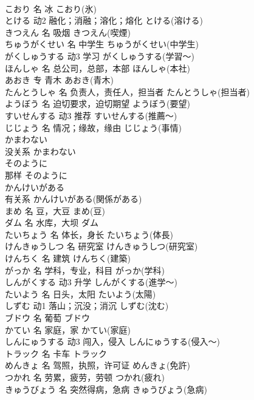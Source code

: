 \documentclass[8pt]{extreport}
\begin{document}
\begin{CJK}{UTF8}{min}
\\	こおり	名	冰	こおり(氷)	
\\	とける	动2	融化；消融；溶化；熔化	とける(溶ける)	
\\	きつえん	名	吸烟	きつえん(喫煙)	
\\	ちゅうがくせい	名	中学生	ちゅうがくせい(中学生)	
\\	がくしゅうする	动3	学习	がくしゅうする(学習～)	
\\	ほんしゃ	名	总公司，总部，本部	ほんしゃ(本社)	
\\	あおき	专	青木	あおき(青木)	
\\	たんとうしゃ	名	负责人，责任人，担当者	たんとうしゃ(担当者)	
\\	ようぼう	名	迫切要求，迫切期望	ようぼう(要望)	
\\	すいせんする	动3	推荐	すいせんする(推薦～)	
\\	じじょう	名	情况；缘故，缘由	じじょう(事情)	
\\	かまわない	
\\	没关系	かまわない	
\\	そのように	
\\	那样	そのように	
\\	かんけいがある	
\\	有关系	かんけいがある(関係がある)	
\\	まめ	名	豆，大豆	まめ(豆)	
\\	ダム	名	水库，大坝	ダム	
\\	たいちょう	名	体长，身长	たいちょう(体長)	
\\	けんきゅうしつ	名	研究室	けんきゅうしつ(研究室)	
\\	けんちく	名	建筑	けんちく(建築)	
\\	がっか	名	学科，专业，科目	がっか(学科)	
\\	しんがくする	动3	升学	しんがくする(進学～)	
\\	たいよう	名	日头，太阳	たいよう(太陽)	
\\	しずむ	动1	落山；沉没；消沉	しずむ(沈む)	
\\	ブドウ	名	葡萄	ブドウ	
\\	かてい	名	家庭，家	かてい(家庭)	
\\	しんにゅうする	动3	闯入，侵入	しんにゅうする(侵入～)	
\\	トラック	名	卡车	トラック	
\\	めんきょ	名	驾照，执照，许可证	めんきょ(免許)	
\\	つかれ	名	劳累，疲劳，劳顿	つかれ(疲れ)	
\\	きゅうびょう	名	突然得病，急病	きゅうびょう(急病)	

\end{CJK}
\end{document}
